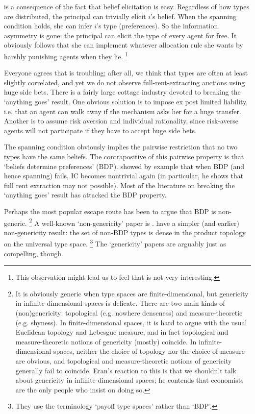 \documentclass[11pt,letterpaper,reqno,oneside]{article}
\begin{document}
 is a consequence of the fact that belief elicitation is easy. Regardless of how types are distributed, the principal can trivially elicit $i$'s belief. When the spanning condition holds, she can infer $i$'s type (preferences). So the information asymmetry is gone: the principal can elicit the type of every agent for free. It obviously follows that she can implement whatever allocation rule she wants by harshly punishing agents when they lie.%
	\footnote{This observation might lead us to feel that  is not very interesting.}


Everyone agrees that  is troubling; after all, we think that types are often at least slightly correlated, and yet we do not observe full-rent-extracting auctions using huge side bets. There is a fairly large cottage industry devoted to breaking the `anything goes' result. One obvious solution is to impose ex post limited liability, i.e. that an agent can walk away if the mechanism asks her for a huge transfer. Another is to assume risk aversion and individual rationality, since risk-averse agents will not participate if they have to accept huge side bets.

The spanning condition obviously implies the pairwise restriction that no two types have the same beliefs. The contrapositive of this pairwise property is that `beliefs determine preferences' (BDP). \textcite{Neeman2004} showed by example that when BDP (and hence spanning) fails, IC becomes nontrivial again (in particular, he shows that full rent extraction may not possible). Most of the literature on breaking the `anything goes' result has attacked the BDP property.

Perhaps the most popular escape route has been to argue that BDP is non-generic.%
	\footnote{It is obviously generic when type spaces are finite-dimensional, but genericity in infinite-dimensional spaces is delicate. There are two main kinds of (non)genericity: topological (e.g. nowhere denseness) and measure-theoretic (e.g. shyness). In finite-dimensional spaces, it is hard to argue with the usual Euclidean topology and Lebesgue measure, and in fact topological and measure-theoretic notions of genericity (mostly) coincide. In infinite-dimensional spaces, neither the choice of topology nor the choice of measure are obvious, and topological and measure-theoretic notions of genericity generally fail to coincide. Eran's reaction to this is that we shouldn't talk about genericity in infinite-dimensional spaces; he contends that economists are the only people who insist on doing so.}
A well-known `non-genericity' paper is \textcite{HeifetzNeeman2006}. \textcite{BergemannMorris2005} have a simpler (and earlier) non-genericity result: the set of non-BDP types is dense in the product topology on the universal type space.%
	\footnote{They use the terminology `payoff type spaces' rather than `BDP'.}
The `genericity' papers are arguably just as compelling, though.
\end{document}
